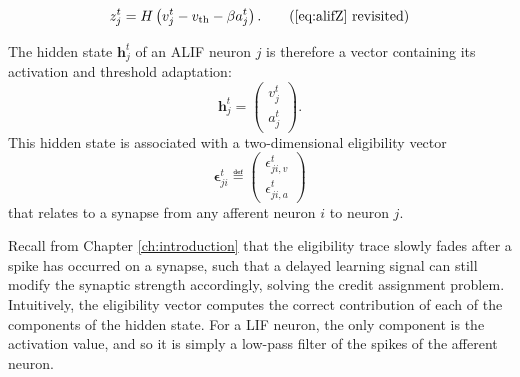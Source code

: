             \begin{equation*}
            z^t_j = H\left(v_j^t - v_\text{th} - \beta a^t_j\right). \tag{\ref{eq:alifZ} revisited}
            \end{equation*}

            The hidden state $\mathbf{h}^t_j$ of an ALIF neuron $j$ is therefore a vector containing its activation and threshold adaptation:
            \begin{equation}
            \mathbf{h}^t_j = \begin{pmatrix}
            v^t_j\\
            a^t_j
            \end{pmatrix}.
            \end{equation}
            This hidden state is associated with a two-dimensional eligibility vector
            \begin{equation}
            \bm{\epsilon}^t_{ji} \eqdef \begin{pmatrix}
            \epsilon_{ji, v}^t\\
            \epsilon_{ji, a}^t
            \end{pmatrix}
            \end{equation}
            that relates to a synapse from any afferent neuron $i$ to neuron $j$.

            Recall from Chapter \ref{ch:introduction} that the eligibility trace slowly fades after a spike has occurred on a synapse, such that a delayed learning signal can still modify the synaptic strength accordingly, solving the credit assignment problem.
            Intuitively, the eligibility vector computes the correct contribution of each of the components of the hidden state.
            For a LIF neuron, the only component is the activation value, and so it is simply a low-pass filter of the spikes of the afferent neuron.

